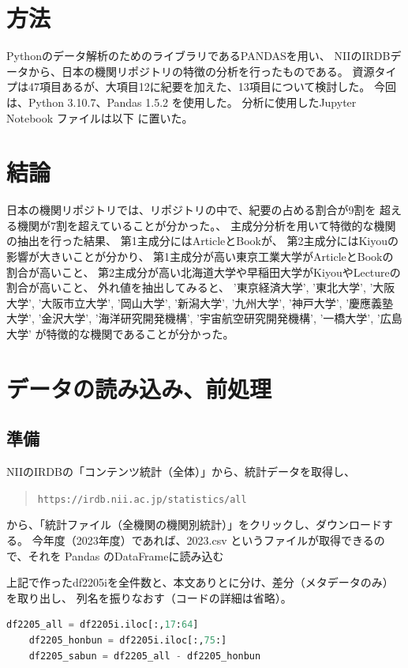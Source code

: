 \documentclass[submit,noauthor]{ono}
\def\|{\verb|}
\begin{document}
%2
\section{方法}
Pythonのデータ解析のためのライブラリであるPANDASを用い、
NIIのIRDBデータから、日本の機関リポジトリの特徴の分析を行ったものである。
資源タイプは47項目あるが、大項目12に紀要を加えた、13項目について検討した。
今回は、Python 3.10.7、Pandas 1.5.2 を使用した。
分析に使用したJupyter Notebook ファイルは以下
に置いた。

%3
\section{結論}
日本の機関リポジトリでは、リポジトリの中で、紀要の占める割合が9割を
超える機関が7割を超えていることが分かった。、
主成分分析を用いて特徴的な機関の抽出を行った結果、
第1主成分にはArticleとBookが、
第2主成分にはKiyouの影響が大きいことが分かり、
第1主成分が高い東京工業大学がArticleとBookの割合が高いこと、
第2主成分が高い北海道大学や早稲田大学がKiyouやLectureの割合が高いこと、
外れ値を抽出してみると、
'東京経済大学', '東北大学', '大阪大学', '大阪市立大学', '岡山大学', '新潟大学', '九州大学', '神戸大学', '慶應義塾大学', '金沢大学', '海洋研究開発機構', '宇宙航空研究開発機構', '一橋大学', '広島大学'
が特徴的な機関であることが分かった。

%4
\section{データの読み込み、前処理}
%4.1
\subsection{準備}

NIIのIRDBの「コンテンツ統計（全体）」から、統計データを取得し、
\begin{quote}
	\small
	\|https://irdb.nii.ac.jp/statistics/all|
\end{quote}
から、「統計ファイル（全機関の機関別統計）」をクリックし、ダウンロードする。
今年度（2023年度）であれば、2023.csv というファイルが取得できるので、それを
Pandas のDataFrameに読み込む

上記で作ったdf2205iを全件数と、本文ありとに分け、差分（メタデータのみ）を取り出し、
列名を振りなおす（コードの詳細は省略）。

\begin{lstlisting}[language=Python,breaklines,caption=hoge,label=df2205_all]
	df2205_all = df2205i.iloc[:,17:64]
	df2205_honbun = df2205i.iloc[:,75:]
	df2205_sabun = df2205_all - df2205_honbun
\end{lstlisting}
\end{document}
